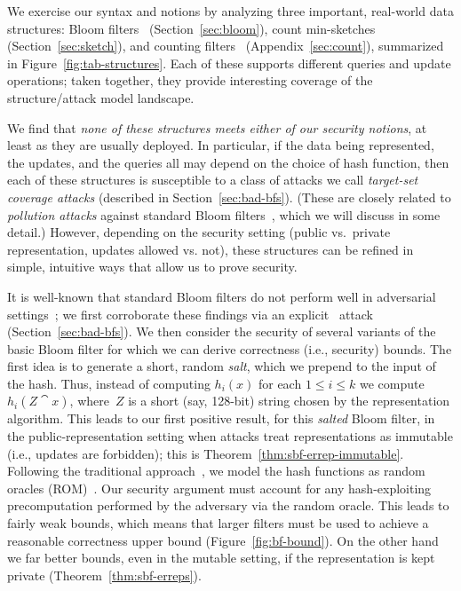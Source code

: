 
We exercise our syntax and notions by analyzing three important, real-world data
structures: Bloom filters~\cite{bloom1970space} (Section~\ref{sec:bloom}), count
min-sketches~\cite{cormode2005improved} (Section~\ref{sec:sketch}), and counting
filters~\cite{fan2000summary} (Appendix~\ref{sec:count}), summarized in
Figure~\ref{fig:tab-structures}. Each of these supports different queries and
update operations; taken together, they provide interesting coverage
of the structure/attack model landscape. 

We find
that \emph{none of these structures meets either of our security notions}, at least as
they are usually deployed. In particular, if the data being represented,
the updates, and the queries all may depend on the choice of hash function, then each of
these structures is susceptible to a class of attacks we call \emph{target-set
coverage attacks} (described in Section~\ref{sec:bad-bfs}). (These are closely
related to \emph{pollution attacks} against standard Bloom
filters~\cite{gerbet2015power}, which we will discuss in some detail.)
%
However, depending on the security setting (public vs.\ private
representation, updates allowed vs. not), these structures can be refined in
simple, intuitive ways that allow us to prove security.

%
It is well-known that standard Bloom filters do not perform well in adversarial
settings~\cite{naor2015bloom,gerbet2015power}; we first corroborate these
findings via an explicit \erreps\ attack (Section~\ref{sec:bad-bfs}).
%
We then consider the security of several variants of the basic Bloom
filter for which we can derive correctness (i.e., security) bounds.
%
The first idea is to generate a short, random \emph{salt}, which we prepend to
the input of the hash. Thus, instead of computing $h_i(x)$ for each $1\leq i
\leq k$ we compute $h_i(Z \cat x)$, where~$Z$ is a short (say, 128-bit) string
chosen by the representation algorithm.
%
This leads to our first positive result, for this \emph{salted} Bloom filter, in the
public-representation setting when attacks treat representations as
immutable (i.e., updates are forbidden); this is Theorem~\ref{thm:sbf-errep-immutable}.
%
Following the traditional approach~\cite{broder2004network}, we model the hash functions as random oracles
(ROM)~\cite{BR93}.  Our security argument must account for any hash-exploiting
precomputation performed by the adversary via the random oracle. This leads to
fairly weak bounds, which means that larger filters must be used to achieve a
reasonable correctness upper bound (Figure~\ref{fig:bf-bound}). 
%
On the other
hand we far better bounds, even in the mutable setting, if the
representation is kept private (Theorem~\ref{thm:sbf-erreps}). 

